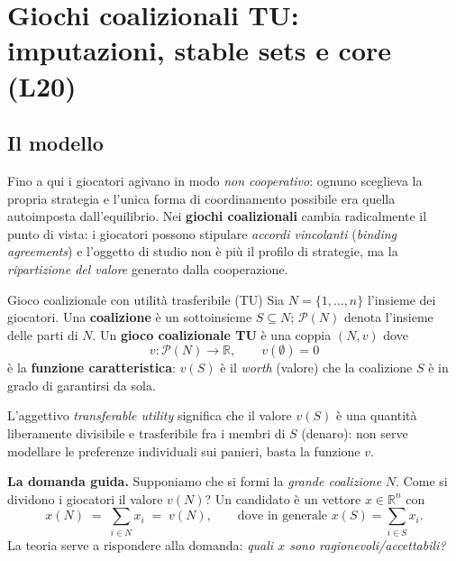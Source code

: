 \documentclass[12pt,a4paper,twoside]{book}
\theoremstyle{plain}
\theoremstyle{definition}
\begin{document}

\chapter{Giochi coalizionali TU: imputazioni, stable sets e core (L20)}
\label{ch:tu-core}

\section{Il modello}

Fino a qui i giocatori agivano in modo \emph{non cooperativo}: ognuno sceglieva la
propria strategia e l'unica forma di coordinamento possibile era quella
autoimposta dall'equilibrio. Nei \textbf{giochi coalizionali} cambia
radicalmente il punto di vista: i giocatori possono stipulare \emph{accordi
vincolanti} (\textit{binding agreements}) e l'oggetto di studio non è più il
profilo di strategie, ma la \emph{ripartizione del valore} generato dalla
cooperazione.

\begin{defbox}{Gioco coalizionale con utilità trasferibile (TU)}
Sia $N=\{1,\dots,n\}$ l'insieme dei giocatori. Una \textbf{coalizione} è un
sottoinsieme $S\subseteq N$; $\mathcal{P}(N)$ denota l'insieme delle parti di $N$.
Un \textbf{gioco coalizionale TU} è una coppia $(N,v)$ dove
\[
  v:\mathcal{P}(N)\to\mathbb{R},\qquad v(\emptyset)=0
\]
è la \textbf{funzione caratteristica}: $v(S)$ è il \emph{worth} (valore) che la
coalizione $S$ è in grado di garantirsi da sola.
\end{defbox}

L'aggettivo \emph{transferable utility} significa che il valore $v(S)$ è una
quantità liberamente divisibile e trasferibile fra i membri di $S$ (denaro): non
serve modellare le preferenze individuali sui panieri, basta la funzione $v$.

\medskip
\noindent\textbf{La domanda guida.} Supponiamo che si formi la \emph{grande
coalizione} $N$. Come si dividono i giocatori il valore $v(N)$? Un candidato è
un vettore $x\in\mathbb{R}^n$ con
\[
  x(N)\;=\;\sum_{i\in N}x_i\;=\;v(N),
  \qquad\text{dove in generale } x(S)=\sum_{i\in S}x_i .
\]
La teoria serve a rispondere alla domanda: \emph{quali $x$ sono
ragionevoli/accettabili?}
\end{document}
